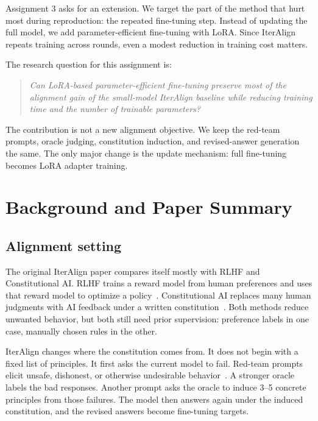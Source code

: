 \documentclass[11pt]{article}
\begin{document}
Assignment 3 asks for an extension. We target the part of the method that hurt most during reproduction: the repeated fine-tuning step. Instead of updating the full model, we add parameter-efficient fine-tuning with LoRA. Since IterAlign repeats training across rounds, even a modest reduction in training cost matters.

The research question for this assignment is:
\begin{quote}
\textit{Can LoRA-based parameter-efficient fine-tuning preserve most of the alignment gain of the small-model IterAlign baseline while reducing training time and the number of trainable parameters?}
\end{quote}

The contribution is not a new alignment objective. We keep the red-team prompts, oracle judging, constitution induction, and revised-answer generation the same. The only major change is the update mechanism: full fine-tuning becomes LoRA adapter training.

\section{Background and Paper Summary}
\label{sec:background}

\subsection{Alignment setting}
The original IterAlign paper compares itself mostly with RLHF and Constitutional AI. RLHF trains a reward model from human preferences and uses that reward model to optimize a policy~\cite{ouyang2022instructgpt}. Constitutional AI replaces many human judgments with AI feedback under a written constitution~\cite{bai2022cai}. Both methods reduce unwanted behavior, but both still need prior supervision: preference labels in one case, manually chosen rules in the other.

IterAlign changes where the constitution comes from. It does not begin with a fixed list of principles. It first asks the current model to fail. Red-team prompts elicit unsafe, dishonest, or otherwise undesirable behavior~\cite{ganguli2022redteam}. A stronger oracle labels the bad responses. Another prompt asks the oracle to induce 3--5 concrete principles from those failures. The model then answers again under the induced constitution, and the revised answers become fine-tuning targets.
\end{document}
